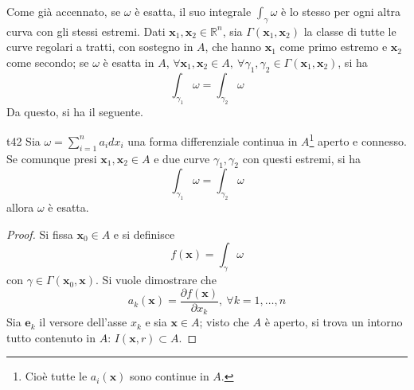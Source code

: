 \documentclass[10pt, a4paper]{scrartcl}
\theoremstyle{definition}
\numberwithin{esempio}{section}
\theoremstyle{definition}
\numberwithin{obs}{section}
\numberwithin{nota}{section}
\numberwithin{equation}{subsection}
\begin{document}
Come gi\`a accennato, se $\omega$ \`e esatta, il suo integrale $\int_{\gamma} \omega$ \`e lo stesso per ogni altra curva con gli stessi estremi. 
Dati $\mathbf{x} _1, \mathbf{x} _2 \in \mathbb{R}^n$, sia $\Gamma(\mathbf{x} _1, \mathbf{x} _2)$ la classe di tutte le curve regolari a tratti, con sostegno in $A$, che hanno $\mathbf{x} _1$ come primo estremo e $\mathbf{x} _2$ come secondo; se $\omega$ \`e esatta in $A$, $\forall \mathbf{x} _1, \mathbf{x} _2 \in A , \ \forall \gamma_1, \gamma_2 \in \Gamma(\mathbf{x} _1, \mathbf{x} _2)$, si ha
\[
\int_{\gamma_1} \omega = \int_{\gamma_2} \omega
\] 
Da questo, si ha il seguente.
\begin{teorema}
	{}{t42}
	Sia $\omega = \sum_{i=1}^{n} a_i dx_i$ una forma differenziale continua in $A$\footnote{Cio\`e tutte le $a_i(\mathbf{x} )$ sono continue in $A$.} aperto e connesso. 
	Se comunque presi $\mathbf{x} _1,\mathbf{x} _2 \in A$ e due curve $\gamma_1, \gamma_2$ con questi estremi, si ha 
	\[
	\int_{\gamma_1} \omega = \int_{\gamma_2} \omega
	\] 
	allora $\omega$ \`e esatta.
	\begin{proof}
		Si fissa $\mathbf{x} _0 \in A$ e si definisce 
		\[
		f(\mathbf{x} ) = \int_{\gamma} \omega
		\] 
		con $\gamma \in \Gamma(\mathbf{x} _0 ,\mathbf{x} )$.
		Si vuole dimostrare che
		\[
		a_k(\mathbf{x} ) = \frac{\partial f(\mathbf{x} )}{\partial x_k} , \  \forall k = 1,\ldots,n
		\] 
		Sia $\mathbf{e} _k$ il versore dell'asse $x_k$ e sia $\mathbf{x} \in A$; visto che $A$ \`e aperto, si trova un intorno tutto contenuto in $A$: $I(\mathbf{x} ,r)\subset A$.
		

\end{proof}
\end{teorema}
\end{document}

